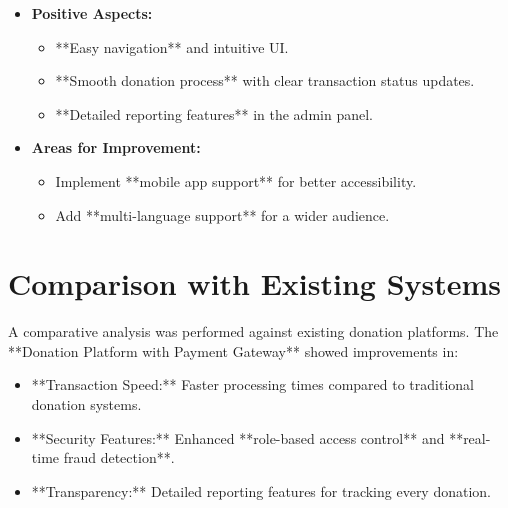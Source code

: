\begin{itemize}
    \item \textbf{Positive Aspects:}
    \begin{itemize}
        \item **Easy navigation** and intuitive UI.
        \item **Smooth donation process** with clear transaction status updates.
        \item **Detailed reporting features** in the admin panel.
    \end{itemize}
    
    \item \textbf{Areas for Improvement:}
    \begin{itemize}
        \item Implement **mobile app support** for better accessibility.
        \item Add **multi-language support** for a wider audience.
    \end{itemize}
\end{itemize}

\section{Comparison with Existing Systems}
A comparative analysis was performed against existing donation platforms. The **Donation Platform with Payment Gateway** showed improvements in:

\begin{itemize}
    \item **Transaction Speed:** Faster processing times compared to traditional donation systems.
    \item **Security Features:** Enhanced **role-based access control** and **real-time fraud detection**.
    \item **Transparency:** Detailed reporting features for tracking every donation.
\end{itemize}